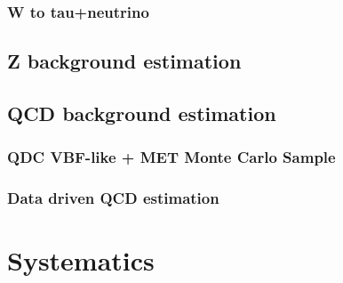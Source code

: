 \subsubsection{W to tau+neutrino}


\subsection{Z background estimation}


\subsection{QCD background estimation}


\subsubsection{QDC VBF-like + MET Monte Carlo Sample}


\subsubsection{Data driven QCD estimation}


\section{Systematics}

